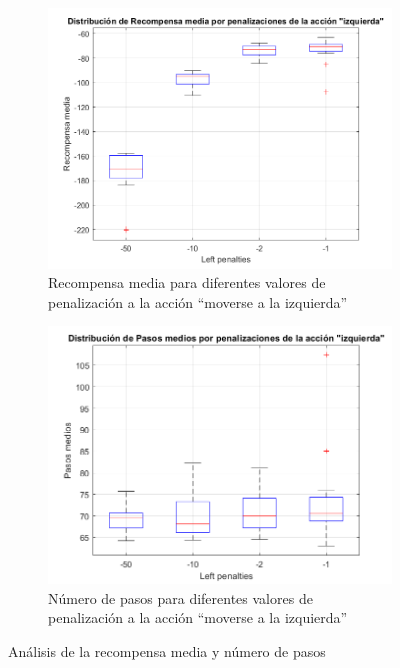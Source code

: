 \begin{figure}[H]
    \centering
    \begin{subfigure}{0.7\textwidth}
        \centering
        \includegraphics[width=\textwidth]{../../experiments/qlearning/experiment-5/results/reward.png}
        \caption{Recompensa media para diferentes valores de penalización a la acción ``moverse a la izquierda''}
        \label{fig:qlearning-subfig-reward}
    \end{subfigure}
    \hfill
    \begin{subfigure}{0.7\textwidth}
        \centering
        \includegraphics[width=\textwidth]{../../experiments/qlearning/experiment-5/results/steps.png}
        \caption{Número de pasos para diferentes valores de penalización a la acción ``moverse a la izquierda''}
        \label{fig:qlearning-subfig-steps}
    \end{subfigure}
    \caption{Análisis de la recompensa media y número de pasos}
    \label{fig:qlearning-reward}
\end{figure}

